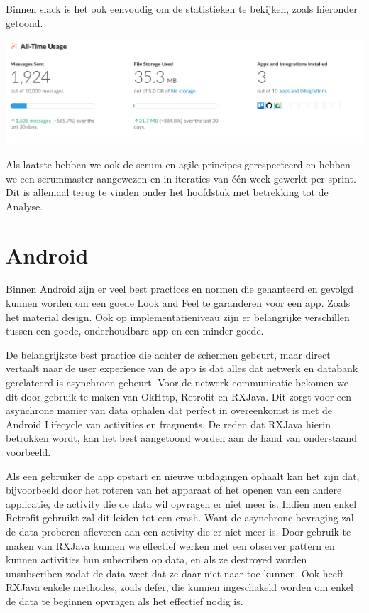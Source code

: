 Binnen slack is het ook eenvoudig om de statistieken te bekijken, zoals hieronder getoond.

\includegraphics[width=15cm]{img/slack_integrations.png}

Als laatste hebben we ook de scrum en agile principes gerespecteerd en hebben we een scrummaster aangewezen en in iteraties van één week gewerkt per sprint. Dit is allemaal terug te vinden onder het hoofdstuk met betrekking tot de Analyse.


\section{Android}
Binnen Android zijn er veel best practices en normen die gehanteerd en gevolgd kunnen worden om een goede Look and Feel te garanderen voor een app. Zoals het material design. Ook op implementatieniveau zijn er belangrijke verschillen tussen een goede, onderhoudbare app en een minder goede. 

De belangrijkste best practice die achter de schermen gebeurt, maar direct vertaalt naar de user experience van de app is dat alles dat netwerk en databank gerelateerd is asynchroon gebeurt. Voor de netwerk communicatie bekomen we dit door gebruik te maken van OkHttp, Retrofit en RXJava. Dit zorgt voor een asynchrone manier van data ophalen dat perfect in overeenkomst is met de Android Lifecycle van activities en fragments. De reden dat RXJava hierin betrokken wordt, kan het best aangetoond worden aan de hand van onderstaand voorbeeld. 

Als een gebruiker de app opstart en nieuwe uitdagingen ophaalt kan het zijn dat, bijvoorbeeld door het roteren van het apparaat of het openen van een andere applicatie, de activity die de data wil opvragen er niet meer is. Indien men enkel Retrofit gebruikt zal dit leiden tot een crash. Want de asynchrone bevraging zal de data proberen afleveren aan een activity die er niet meer is. Door gebruik te maken van RXJava kunnen we effectief werken met een observer pattern en kunnen activities hun subscriben op data, en als ze destroyed worden unsubscriben zodat de data weet dat ze daar niet naar toe kunnen. Ook heeft RXJava enkele methodes, zoals defer, die kunnen ingeschakeld worden om enkel de data te beginnen opvragen als het effectief nodig is.

